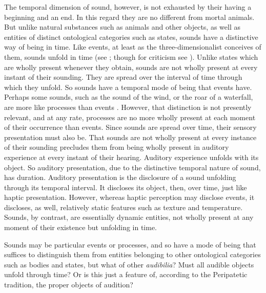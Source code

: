 The temporal dimension of sound, however, is not exhausted by their having a beginning and an end. In this regard they are no different from mortal animals. But unlike natural substances such as animals and other objects, as well as entities of distinct ontological categories such as states, sounds have a distinctive way of being in time. Like events, at least as the three-dimensionalist conceives of them, sounds unfold in time (see \citealt{Fine:2006fk}; though for criticism see \citealt{Sider:1997fk,Hawthorne:2008uq}). Unlike states which are wholly present whenever they obtain, sounds are not wholly present at every instant of their sounding. They are spread over the interval of time through which they unfold. So sounds have a temporal mode of being that events have. Perhaps some sounds, such as the sound of the wind, or the roar of a waterfall, are more like processes than events \citep[4]{Broad:1952kx}. However, that distinction is not presently relevant, and at any rate, processes are no more wholly present at each moment of their occurrence than events. Since sounds are spread over time, their sensory presentation must also be. That sounds are not wholly present at every instance of their sounding precludes them from being wholly present in auditory experience at every instant of their hearing. Auditory experience unfolds with its object. So auditory presentation, due to the distinctive temporal nature of sound, has duration. Auditory presentation is the disclosure of a sound unfolding through its temporal interval. It discloses its object, then, over time, just like haptic presentation. However, whereas haptic perception may disclose events, it discloses, as well, relatively static features such as texture and temperature. Sounds, by contrast, are essentially dynamic entities, not wholly present at any moment of their existence but unfolding in time. 

Sounds may be particular events or processes, and so have a mode of being that suffices to distinguish them from entities belonging to other ontological categories such as bodies and states, but what of other \emph{audibilia}? Must all audible objects unfold through time? Or is this just a feature of, according to the Peripatetic tradition, the proper objects of audition? 

